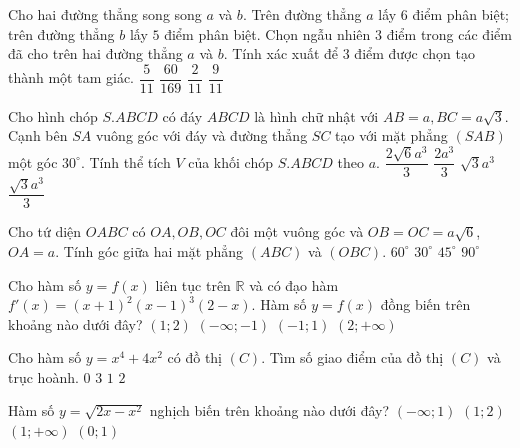 \begin{ex}%
 Cho hai đường thẳng song song $a$ và $b$. Trên đường thẳng $a$ lấy $6$ điểm phân biệt; trên đường thẳng $b$ lấy $5$ điểm phân biệt. Chọn ngẫu nhiên $3$ điểm trong các điểm đã cho trên hai đường thẳng $a$ và $b$. Tính xác xuất để $3$ điểm được chọn tạo thành một tam giác.
\choice
{$\dfrac{5}{11}$}
{$\dfrac{60}{169}$}
{$\dfrac{2}{11}$}
{\True $\dfrac{9}{11}$}
\end{ex}
\begin{ex}%
Cho hình chóp $S.ABCD$ có đáy $ABCD$ là hình chữ nhật với $AB=a, BC=a\sqrt{3}$. Cạnh bên $SA$ vuông góc với đáy và đường thẳng $SC$ tạo với mặt phẳng $(SAB)$ một góc $30^{\circ}$. Tính thể tích $V$ của khối chóp $S.ABCD$ theo $a$.
\choice
{\True $\dfrac{2\sqrt{6}a^3}{3}$}
{$\dfrac{2a^3}{3}$}
{$\sqrt{3}a^3$}
{$\dfrac{\sqrt{3}a^3}{3}$}
\end{ex}
\begin{ex}%
 Cho tứ diện $OABC$ có $OA, OB, OC$ đôi một vuông góc và $OB=OC=a\sqrt{6}$, $OA=a$. Tính góc giữa hai mặt phẳng $(ABC)$ và $(OBC)$.
\choice
{$60^{\circ}$}
{\True $30^{\circ}$}
{$45^{\circ}$}
{$90^{\circ}$}
\end{ex}
\begin{ex}%
 Cho hàm số $y=f(x)$ liên tục trên $\mathbb{R}$ và có đạo hàm $f'(x)=(x+1)^2(x-1)^3(2-x)$. Hàm số $y=f(x)$ đồng biến trên khoảng nào dưới đây?
\choice
{\True $(1;2)$}
{$(-\infty;-1)$}
{$(-1;1)$}
{$(2;+\infty)$}
\end{ex}
\begin{ex}%
Cho hàm số $y=x^4+4x^2$ có đồ thị $(C)$. Tìm số giao điểm của đồ thị $(C)$ và trục hoành.
\choice
{$0$}
{$3$}
{\True $1$}
{$2$}
\end{ex}
\begin{ex}%
Hàm số $y=\sqrt{2x-x^2}$ nghịch biến trên khoảng nào dưới đây?
\choice
{$(-\infty;1)$}
{\True $(1;2)$}
{$(1;+\infty)$}
{$(0;1)$}
\end{ex}
